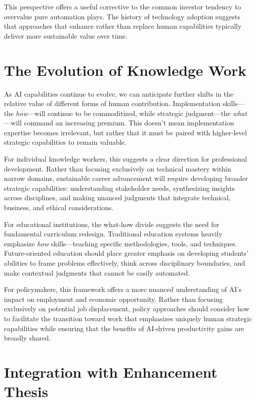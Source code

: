 \documentclass[
  Letterpaper,
]{scrbook}
\begin{document}
This perspective offers a useful corrective to the common investor
tendency to overvalue pure automation plays. The history of technology
adoption suggests that approaches that enhance rather than replace human
capabilities typically deliver more sustainable value over time.

\section{The Evolution of Knowledge
Work}\label{the-evolution-of-knowledge-work}

As AI capabilities continue to evolve, we can anticipate further shifts
in the relative value of different forms of human contribution.
Implementation skills---the \emph{how}---will continue to be
commoditized, while strategic judgment---the \emph{what}---will command
an increasing premium. This doesn't mean implementation expertise
becomes irrelevant, but rather that it must be paired with higher-level
strategic capabilities to remain valuable.

For individual knowledge workers, this suggests a clear direction for
professional development. Rather than focusing exclusively on technical
mastery within narrow domains, sustainable career advancement will
require developing broader strategic capabilities: understanding
stakeholder needs, synthesizing insights across disciplines, and making
nuanced judgments that integrate technical, business, and ethical
considerations.

For educational institutions, the what-how divide suggests the need for
fundamental curriculum redesign. Traditional education systems heavily
emphasize \emph{how} skills---teaching specific methodologies, tools,
and techniques. Future-oriented education should place greater emphasis
on developing students' abilities to frame problems effectively, think
across disciplinary boundaries, and make contextual judgments that
cannot be easily automated.

For policymakers, this framework offers a more nuanced understanding of
AI's impact on employment and economic opportunity. Rather than focusing
exclusively on potential job displacement, policy approaches should
consider how to facilitate the transition toward work that emphasizes
uniquely human strategic capabilities while ensuring that the benefits
of AI-driven productivity gains are broadly shared.

\section{Integration with Enhancement
Thesis}\label{integration-with-enhancement-thesis}
\end{document}
